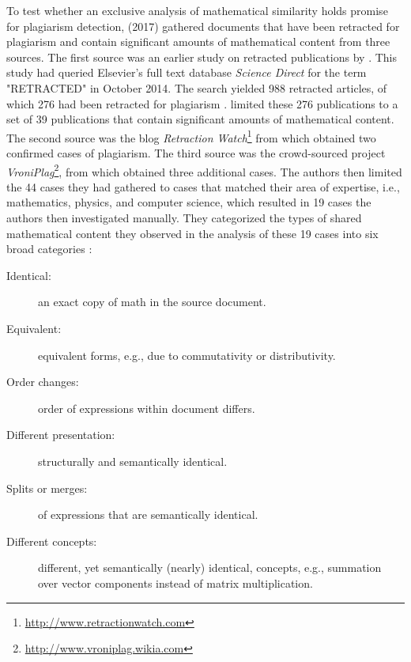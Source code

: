 \documentclass{llncs}
\begin{document}
To test whether an exclusive analysis of mathematical similarity holds promise for plagiarism detection, \citeauthor{Meuschke2017a} (2017) gathered documents that have been retracted for plagiarism and contain significant amounts of mathematical content from three sources. The first source was an earlier study on retracted publications by \citeauthor{Halevi2016} \cite{Halevi2016}. This study had queried Elsevier's full text database \textit{Science Direct} for the term "RETRACTED" in October 2014. The search yielded 988 retracted articles, of which 276 had been retracted for plagiarism \cite{Halevi2016}. \citeauthor{Meuschke2017a} limited these 276 publications to a set of 39 publications that contain significant amounts of mathematical content. The second source was the blog \textit{Retraction Watch}\footnote{\url{http://www.retractionwatch.com}} from which \citeauthor{Meuschke2017a} obtained two confirmed cases of plagiarism. The third source was the crowd-sourced project \textit{VroniPlag}\footnote{\url{http://www.vroniplag.wikia.com}}, from which \citeauthor{Meuschke2017a} obtained three additional cases. The authors then limited the 44 cases they had gathered to cases that matched their area of expertise, i.e., mathematics, physics, and computer science, which resulted in 19 cases the authors then investigated manually. They categorized the types of shared mathematical content they observed in the analysis of these 19 cases into six broad categories \cite{Meuschke2017a}:
\begin{description}
\item [Identical:] an exact copy of math in the source document.
\item [Equivalent:] equivalent forms, e.g., due to commutativity or distributivity.
\item [Order changes:] order of expressions within document differs.
\item [Different presentation:] structurally and semantically identical.
\item [Splits or merges:] of expressions that are semantically identical.
\item [Different concepts:] different, yet semantically (nearly) identical, concepts, e.g., summation over vector components instead of matrix multiplication.
\end{description}
\end{document}
